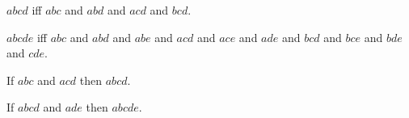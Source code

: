 \documentclass[10pt,a4paper,parskip=half,numbers=endperiod,headings=standardclasses,parskip]{scrartcl}
\newcommand{\Betw}[3]{#1 #2 #3}
\newcommand{\BetwFour}[4]{#1 #2 #3 #4}
\newcommand{\BetwFive}[5]{#1 #2 #3 #4 #5}
\newcommand{\BetwSix}[6]{#1 #2 #3 #4 #5 #6}
\begin{document}


  \begin{forthel}
    \begin{definition}
      $\BetwFour{a}{b}{c}{d}$ iff
      $\Betw{a}{b}{c}$ and
      $\Betw{a}{b}{d}$ and
      $\Betw{a}{c}{d}$ and
      $\Betw{b}{c}{d}$.
    \end{definition}

    \begin{definition}
      $\BetwFive{a}{b}{c}{d}{e}$ iff
      $\Betw{a}{b}{c}$ and
      $\Betw{a}{b}{d}$ and
      $\Betw{a}{b}{e}$ and
      $\Betw{a}{c}{d}$ and
      $\Betw{a}{c}{e}$ and
      $\Betw{a}{d}{e}$ and
      $\Betw{b}{c}{d}$ and
      $\Betw{b}{c}{e}$ and
      $\Betw{b}{d}{e}$ and
      $\Betw{c}{d}{e}$.
    \end{definition}

    \begin{lemma}[BetwThreeToFour] %
      If $\Betw{a}{b}{c}$ and $\Betw{a}{c}{d}$
      then $\BetwFour{a}{b}{c}{d}$.
    \end{lemma}

    \begin{lemma}[BetwFourToFive] %
      If $\BetwFour{a}{b}{c}{d}$ and $\Betw{a}{d}{e}$
      then $\BetwFive{a}{b}{c}{d}{e}$.
    \end{lemma}
  \end{forthel}


\end{document}
